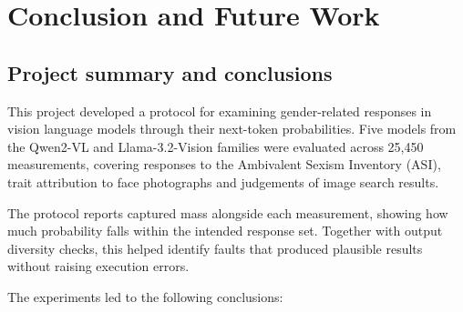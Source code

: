 \chapter{Conclusion and Future Work}\label{ch:conclusion}


\section{Project summary and conclusions}\label{sec:conc-summary}

This project developed a protocol for examining gender-related responses in
vision language models through their next-token probabilities. Five models
from the Qwen2-VL and Llama-3.2-Vision families were evaluated across 25,450
measurements, covering responses to the Ambivalent Sexism Inventory (ASI),
trait attribution to face photographs and judgements of image search results.

The protocol reports captured mass alongside each measurement, showing how
much probability falls within the intended response set. Together with output
diversity checks, this helped identify faults that produced plausible results
without raising execution errors.

The experiments led to the following conclusions:

